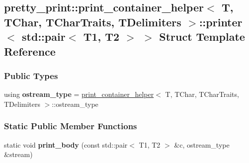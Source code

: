 \hypertarget{structpretty__print_1_1print__container__helper_1_1printer_3_01std_1_1pair_3_01T1_00_01T2_01_4_01_4}{}\subsection{pretty\+\_\+print\+:\+:print\+\_\+container\+\_\+helper$<$ T, T\+Char, T\+Char\+Traits, T\+Delimiters $>$\+:\+:printer$<$ std\+:\+:pair$<$ T1, T2 $>$ $>$ Struct Template Reference}
\label{structpretty__print_1_1print__container__helper_1_1printer_3_01std_1_1pair_3_01T1_00_01T2_01_4_01_4}
\subsubsection*{Public Types}
\begin{DoxyCompactItemize}
\item 
using {\bfseries ostream\+\_\+type} = \hyperlink{structpretty__print_1_1print__container__helper}{print\+\_\+container\+\_\+helper}$<$ T, T\+Char, T\+Char\+Traits, T\+Delimiters $>$\+::ostream\+\_\+type\hypertarget{structpretty__print_1_1print__container__helper_1_1printer_3_01std_1_1pair_3_01T1_00_01T2_01_4_01_4_a8ccbe3d02f49e3c2fdd25fa2912e7d6a}{}\label{structpretty__print_1_1print__container__helper_1_1printer_3_01std_1_1pair_3_01T1_00_01T2_01_4_01_4_a8ccbe3d02f49e3c2fdd25fa2912e7d6a}

\end{DoxyCompactItemize}
\subsubsection*{Static Public Member Functions}
\begin{DoxyCompactItemize}
\item 
static void {\bfseries print\+\_\+body} (const std\+::pair$<$ T1, T2 $>$ \&c, ostream\+\_\+type \&stream)\hypertarget{structpretty__print_1_1print__container__helper_1_1printer_3_01std_1_1pair_3_01T1_00_01T2_01_4_01_4_ad9872abf6f0f5770acb8eb293783df3f}{}\label{structpretty__print_1_1print__container__helper_1_1printer_3_01std_1_1pair_3_01T1_00_01T2_01_4_01_4_ad9872abf6f0f5770acb8eb293783df3f}

\end{DoxyCompactItemize}


